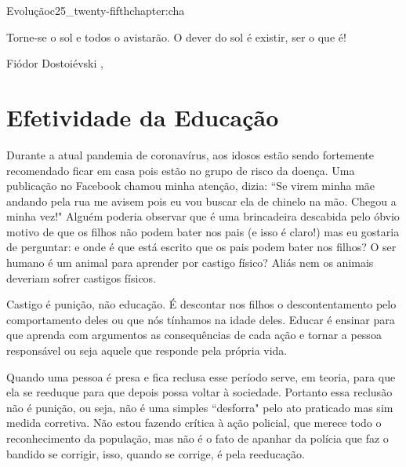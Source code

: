 \begin{chapterpage}{Evolução}{c25_twenty-fifthchapter:cha}

\begin{myquotation}Torne-se o sol e todos o avistarão. O dever do sol é existir, ser o que é! 

\par\vspace*{15mm}
\mbox{}\hfill \emdash{}Fiódor Dostoiévski 
, %
\par\end{myquotation}

\end{chapterpage}



\section{Efetividade da Educação}\label{c1_basicformatting:sec}

\emdash{}Durante a atual pandemia de coronavírus, aos idosos estão sendo fortemente recomendado ficar em casa pois estão no grupo de risco da doença. Uma publicação no Facebook chamou minha atenção, dizia: ``Se virem minha mãe andando pela rua me avisem pois eu vou buscar ela de chinelo na mão. Chegou a minha vez!" Alguém poderia observar que é uma brincadeira descabida pelo óbvio motivo de que os filhos não podem bater nos pais (e isso é claro!) mas eu gostaria de perguntar: e onde é que está escrito que os pais podem bater nos filhos? O ser humano é um animal para aprender por castigo físico? Aliás nem os animais deveriam sofrer castigos físicos.

\emdash{}Castigo é punição, não educação. É descontar nos filhos o descontentamento pelo comportamento deles ou que nós tínhamos na idade deles. Educar é ensinar para que aprenda com argumentos as consequências de cada ação e tornar a pessoa responsável ou seja aquele que responde pela própria vida.

\emdash{}Quando uma pessoa é presa e fica reclusa esse período serve, em teoria, para que ela se reeduque para que depois possa voltar à sociedade. Portanto essa reclusão não é punição, ou seja, não é uma simples ``desforra" pelo ato praticado mas sim medida corretiva. Não estou fazendo crítica à ação policial, que merece todo o reconhecimento da população, mas não é o fato de apanhar da polícia que faz o bandido se corrigir, isso, quando se corrige, é pela reeducação.

